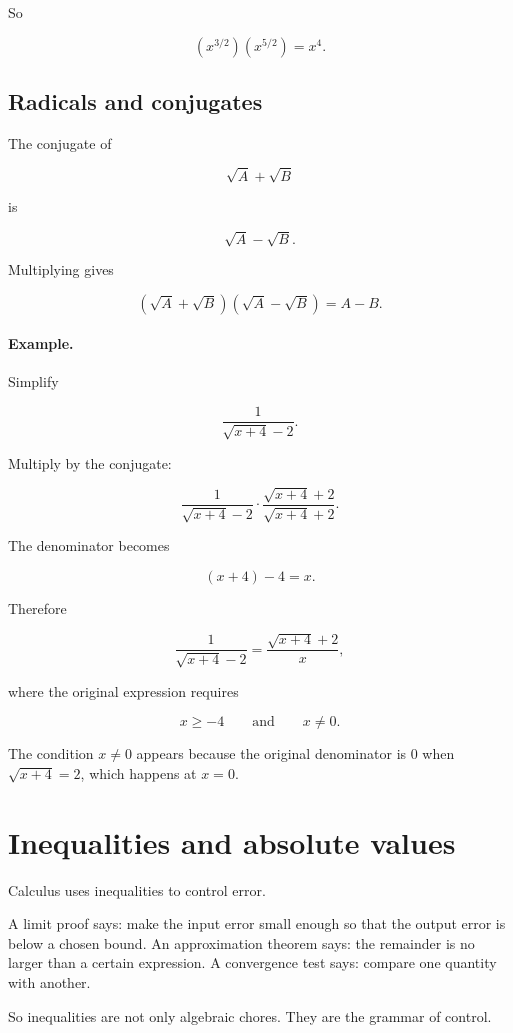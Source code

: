 So

\[
\boxed{
(x^{3/2})(x^{5/2})=x^4.
}
\]

\subsection{Radicals and conjugates}
\label{appsubsec:radicals-conjugates}

The conjugate of

\[
\sqrt{A}+\sqrt{B}
\]

is

\[
\sqrt{A}-\sqrt{B}.
\]

Multiplying gives

\[
(\sqrt{A}+\sqrt{B})(\sqrt{A}-\sqrt{B})=A-B.
\]

\paragraph{Example.}
Simplify

\[
\frac{1}{\sqrt{x+4}-2}.
\]

Multiply by the conjugate:

\[
\frac{1}{\sqrt{x+4}-2}
\cdot
\frac{\sqrt{x+4}+2}{\sqrt{x+4}+2}.
\]

The denominator becomes

\[
(x+4)-4=x.
\]

Therefore

\[
\boxed{
\frac{1}{\sqrt{x+4}-2}
=
\frac{\sqrt{x+4}+2}{x},
}
\]

where the original expression requires

\[
x\ge -4
\qquad\text{and}\qquad
x\neq0.
\]

The condition \(x\neq0\) appears because the original denominator is \(0\) when
\(\sqrt{x+4}=2\), which happens at \(x=0\).

\section{Inequalities and absolute values}
\label{appsec:inequalities-absolute-values}

Calculus uses inequalities to control error.

A limit proof says: make the input error small enough so that the output error is below
a chosen bound.  An approximation theorem says: the remainder is no larger than a
certain expression.  A convergence test says: compare one quantity with another.

So inequalities are not only algebraic chores.  They are the grammar of control.


